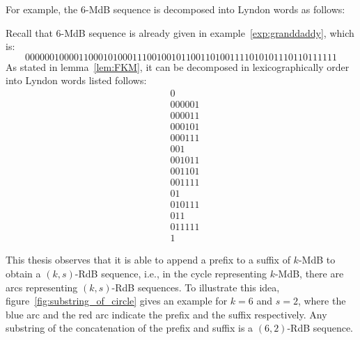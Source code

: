 For example, the $6$-MdB sequence is decomposed into Lyndon words as follows:
\begin{example}
    Recall that $6$-MdB sequence is already given in example~\ref{exp:granddaddy}, which is:
    \[0000001000011000101000111001001011001101001111010101110110111111\]
    As stated in lemma~\ref{lem:FKM}, it can be decomposed in lexicographically order into Lyndon words listed follows:
    \begin{align*}
        &0\\
        &000001\\
        &000011\\
        &000101\\
        &000111\\
        &001\\
        &001011\\
        &001101\\
        &001111\\
        &01\\
        &010111\\
        &011\\
        &011111\\
        &1
    \end{align*}
\end{example}


This thesis observes that it is able to append a prefix to a suffix of $k$-MdB to obtain a $(k,s)$-RdB sequence, i.e., in the cycle representing $k$-MdB, there are arcs representing $(k,s)$-RdB sequences. To illustrate this idea, figure~\ref{fig:substring_of_circle} gives an example for $k=6$ and $s=2$, where the blue arc and the red arc indicate the prefix and the suffix respectively. Any substring of the concatenation of the prefix and suffix is a $(6,2)$-RdB sequence.


